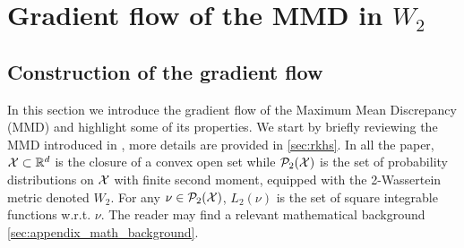 
\section{Gradient flow of the MMD in $W_2$}\label{sec:gradient_flow}
\subsection{Construction of the gradient flow}
In this section we introduce the gradient flow of the Maximum Mean Discrepancy (MMD) and highlight some of its properties. We start by briefly reviewing the MMD introduced in \cite{gretton2012kernel}, more details are provided in \cref{sec:rkhs}. 
In all the paper, ${{\mathcal X}}\subset{{\mathbb R}}^d$ is the closure of a convex open set while $\mathcal{P}_2({{\mathcal X}})$ is the set of probability distributions on ${{\mathcal X}}$ with finite second moment, equipped with the 2-Wassertein metric denoted $W_2$. For any $\nu \in \mathcal{P}_2({{\mathcal X}})$, $L_2(\nu)$ is the set of square integrable functions w.r.t. $\nu$. The reader may find a relevant mathematical background \cref{sec:appendix_math_background}. 

